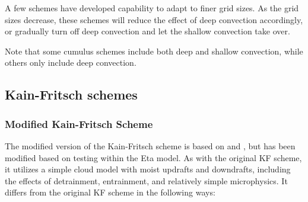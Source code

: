 A few schemes have developed capability to adapt to finer grid sizes. As the grid sizes
decrease, these schemes will reduce the effect of deep convection accordingly, or gradually turn
off deep convection and let the shallow convection take over.

Note that some cumulus schemes include both deep and shallow
convection, while others only include deep convection.
  
\subsection{Kain-Fritsch schemes}

\subsubsection{Modified Kain-Fritsch Scheme}
The modified version of the Kain-Fritsch scheme \citep{kain04} is based on 
\citet{kain90} and \citet{kain93}, but has been modified based on 
testing within the Eta model. As with the original KF scheme, 
it utilizes a simple cloud model with moist updrafts and downdrafts, 
including the effects of detrainment, entrainment, and relatively 
simple microphysics. It differs from the original KF scheme in the following ways:

